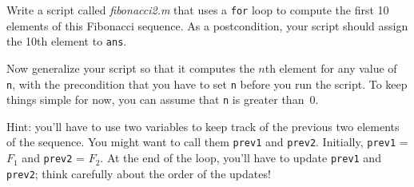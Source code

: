 Write a script called \emph{fibonacci2.m} that uses a \lstinline{for} loop
to compute the first 10 elements of this Fibonacci sequence.
As a postcondition, your script should assign the 10th element to
\lstinline{ans}.

Now generalize your script so that it computes the $n$th element
for any value of \lstinline{n}, with the precondition that you have to
set \lstinline{n} before you run the script.  To keep things simple for
now, you can assume that \lstinline{n} is greater than~0.

Hint: you'll have to use two variables to keep track of the
previous two elements of the sequence.  You might want to call
them \lstinline{prev1} and \lstinline{prev2}.  Initially, \lstinline{prev1} = $F_1$
and \lstinline{prev2} = $F_2$.  At the end of the loop, you'll have
to update \lstinline{prev1} and \lstinline{prev2}; think carefully about the
order of the updates!



